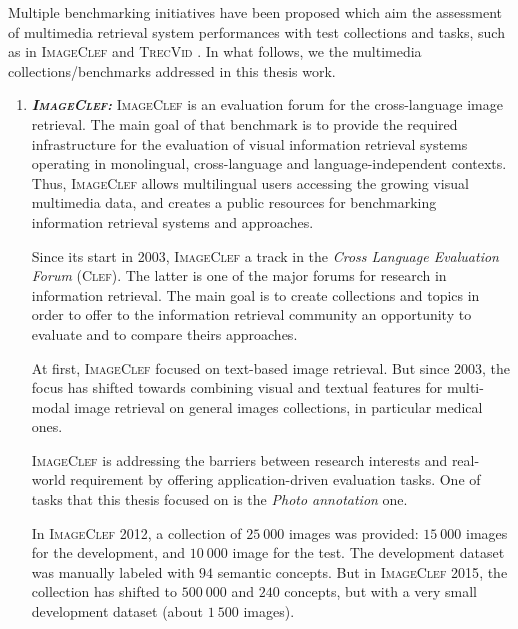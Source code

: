 		Multiple benchmarking initiatives have been proposed which aim the assessment of multimedia 
		retrieval system performances with  test collections and tasks, such as in 
		\textsc{ImageClef} \citep{Villegas2013,Villegas2014,Villegas2015} and \textsc{TrecVid} 
		\citep{Smeaton2006,Over2013,Over2014}. In what follows, we  the multimedia 
		collections/benchmarks addressed in this thesis work.

		\begin{enumerate}
			\item \textit{\textbf{\textsc{ImageClef:}}} \textsc{ImageClef} is an evaluation forum for the 
			cross-language image retrieval.  The main goal of that benchmark is to provide the 
			required infrastructure for the evaluation of visual information retrieval systems 
			operating in monolingual, cross-language and language-independent contexts. 
			Thus, \textsc{ImageClef} allows  multilingual users accessing the growing visual 
			multimedia data, and creates a public resources for benchmarking information retrieval 
			systems and approaches. 

			Since its start in 2003, \textsc{ImageClef} 
			a track in the \emph{Cross Language Evaluation Forum} 
			(\textsc{Clef}). The latter is one of the major forums for research in information retrieval. 
			The main goal is to create collections and topics in order to offer to the information retrieval 
			community an opportunity to evaluate and to compare theirs approaches.

			At first, \textsc{ImageClef} focused on text-based image retrieval. But since 2003, 
			the focus has shifted towards combining visual and textual features for multi-modal 
			image retrieval on general images collections, in particular medical ones.

			\textsc{ImageClef} is addressing the barriers between research interests and real-world 
			requirement by offering application-driven evaluation tasks. One of  tasks that 
			this thesis focused on is the \emph{Photo annotation} one.

			In \textsc{ImageClef 2012}, a collection of $25~000$ images was provided: 
			$15~000$ images for the development, and $10~000$ image for the test. The development dataset 
			was manually labeled with $94$ semantic concepts. But in \textsc{ImageClef 2015}, the collection has shifted 
			to $500~000$ and $240$ concepts, but with a very small development dataset (about $1~500$ images). 


\end{enumerate}
